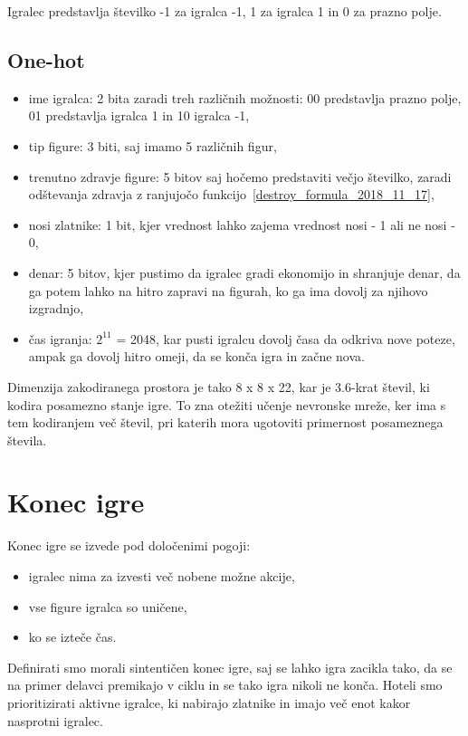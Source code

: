 \documentclass[a4paper, 12pt]{book}
\begin{document}
Igralec predstavlja številko -1 za igralca -1, 1 za igralca 1 in 0 za prazno polje.
\subsection{One-hot}

\begin{itemize}
	\item ime igralca: 2 bita zaradi treh različnih možnosti: 00 predstavlja prazno polje, 01 predstavlja igralca 1 in 10 igralca -1,
	\item tip figure: 3 biti, saj imamo 5 različnih figur,
	\item trenutno zdravje figure: 5 bitov saj hočemo predstaviti večjo številko, zaradi odštevanja zdravja z ranjujočo funkcijo~\ref{destroy_formula_2018_11_17},
	\item nosi zlatnike: 1 bit, kjer vrednost lahko zajema vrednost nosi - 1 ali ne nosi - 0,
	\item denar: 5 bitov, kjer pustimo da igralec gradi ekonomijo in shranjuje denar, da ga potem lahko na hitro zapravi na figurah, ko ga ima dovolj za njihovo izgradnjo,
	\item čas igranja: $2^{11}$ = 2048, kar pusti igralcu dovolj časa da odkriva nove poteze, ampak ga dovolj hitro omeji, da se konča igra in začne nova.
\end{itemize}
Dimenzija zakodiranega prostora je tako 8 x 8 x 22, kar je 3.6-krat števil, ki kodira posamezno stanje igre.
To zna otežiti učenje nevronske mreže, ker ima s tem kodiranjem več števil, pri katerih mora ugotoviti primernost posameznega števila.


\section{Konec igre}
\label{sKonecIgre}
Konec igre se izvede pod določenimi pogoji:
\begin{itemize}
	\item igralec nima za izvesti več nobene možne akcije,
	\item vse figure igralca so uničene,
	\item ko se izteče čas.
\end{itemize}

Definirati smo morali sintentičen konec igre, saj se lahko igra zacikla tako, da se na primer delavci premikajo v ciklu in se tako igra nikoli ne konča.
Hoteli smo prioritizirati aktivne igralce, ki nabirajo zlatnike in imajo več enot kakor nasprotni igralec.
\end{document}
